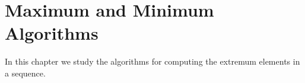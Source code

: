 \chapter{Maximum and Minimum Algorithms}

In this chapter we study the algorithms for computing the extremum
elements in a sequence.






